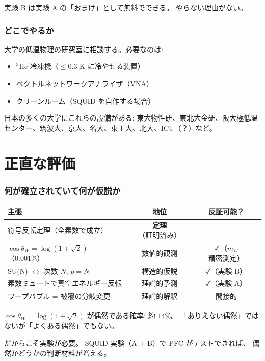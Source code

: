 \documentclass[12pt,a4paper]{article}
\begin{document}
実験 B は実験 A の「おまけ」として無料でできる。
やらない理由がない。

\section{どこでやるか}

大学の低温物理の研究室に相談する。必要なのは:
\begin{itemize}
\item $^3$He 冷凍機（$\leq 0.3$ K に冷やせる装置）
\item ベクトルネットワークアナライザ（VNA）
\item クリーンルーム（SQUID を自作する場合）
\end{itemize}

日本の多くの大学にこれらの設備がある:
東大物性研、東北大金研、阪大極低温センター、筑波大、京大、名大、東工大、北大、ICU（？）など。

\part{正直な評価}

\section{何が確立されていて何が仮説か}

\begin{center}
\renewcommand{\arraystretch}{1.3}
\begin{tabular}{lcc}
\toprule
主張 & 地位 & 反証可能？ \\
\midrule
符号反転定理（全素数で成立） & \textbf{定理}（証明済み） & --- \\
$\cos\theta_W = \log(1+\sqrt{2})$（0.001\%） & 数値的観測 & ✓（$m_W$ 精密測定）\\
SU(N) $\leftrightarrow$ 次数 $N$, $p=N$ & 構造的仮説 & ✓（実験 B）\\
素数ミュートで真空エネルギー反転 & 理論的予測 & ✓（実験 A）\\
ワープバブル = 被覆の分岐変更 & 理論的解釈 & 間接的 \\
\bottomrule
\end{tabular}
\end{center}

\begin{honestbox}[偶然の可能性]
$\cos\theta_W = \log(1+\sqrt{2})$ が偶然である確率: 約 $14\%$。
「ありえない偶然」ではないが「よくある偶然」でもない。

だからこそ実験が必要。
SQUID 実験（A + B）で PFC がテストできれば、
偶然かどうかの判断材料が増える。
\end{honestbox}
\end{document}
